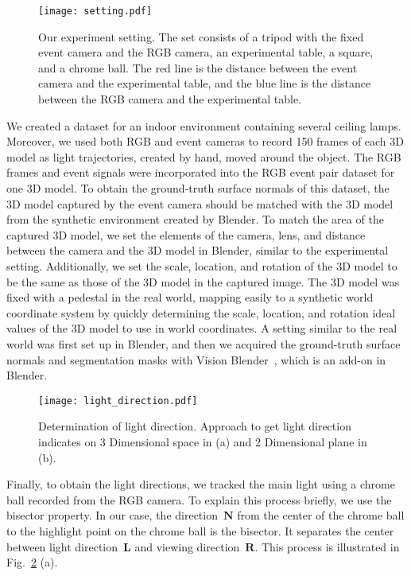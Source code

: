 \begin{figure}[t]
    \centering
    \texttt{[image: setting.pdf]}
    \caption{Our experiment setting. The set consists of a tripod with the fixed event camera and the RGB camera, an experimental table, a square, and a chrome ball. The red line is the distance between the event camera and the experimental table, and the blue line is the distance between the RGB camera and the experimental table.}
    \label{fig:setting}
\end{figure}
We created a dataset for an indoor environment containing several ceiling lamps. Moreover, we used both RGB and event cameras to record 150 frames of each 3D model as light trajectories, created by hand, moved around the object. The RGB frames and event signals were incorporated into the RGB event pair dataset for one 3D model. To obtain the ground-truth surface normals of this dataset, the 3D model captured by the event camera should be matched with the 3D model from the synthetic environment created by Blender. To match the area of the captured 3D model, we set the elements of the camera, lens, and distance between the camera and the 3D model in Blender, similar to the experimental setting. Additionally, we set the scale, location, and rotation of the 3D model to be the same as those of the 3D model in the captured image. The 3D model was fixed with a pedestal in the real world, mapping easily to a synthetic world coordinate system by quickly determining the scale, location, and rotation ideal values of the 3D model to use in world coordinates. A setting similar to the real world was first set up in Blender, and then we acquired the ground-truth surface normals and segmentation masks with Vision Blender~\citep{cartucho2020visionblender}, which is an add-on in Blender.

\begin{figure}[t]
    \centering
    \texttt{[image: light\_direction.pdf]}
    \caption{Determination of light direction. Approach to get light direction indicates on 3 Dimensional space in (a) and 2 Dimensional plane in (b).}
    \label{fig:lightdirection}
\end{figure}
Finally, to obtain the light directions, we tracked the main light using a chrome ball recorded from the RGB camera. To explain this process briefly, we use the bisector property. In our case, the direction~$\textbf{N}$ from the center of the chrome ball to the highlight point on the chrome ball is the bisector. It separates the center between light direction~$\textbf{L}$ and viewing direction~$\textbf{R}$. This process is illustrated in Fig.~\ref{fig:lightdirection} (a).

